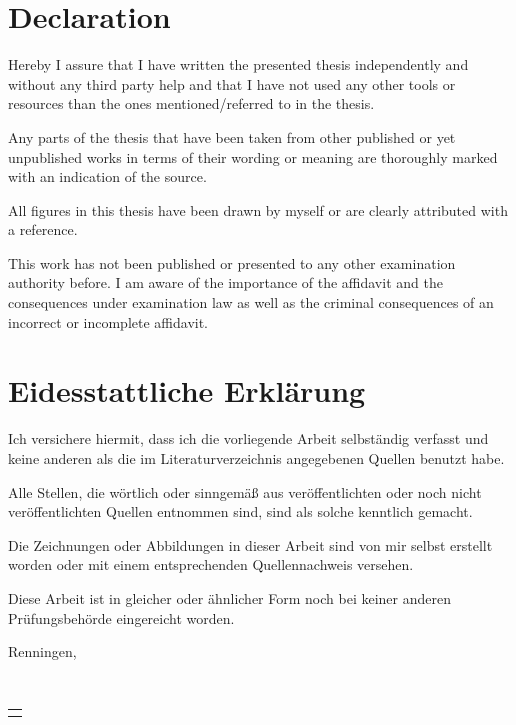 
\ifdefined\ThesisLanguageIsEnglish
	\chapter*{Declaration}
		\thispagestyle{empty}
		Hereby I assure that I have written the presented thesis independently and without any third party help and that I have not used any other tools or resources than the ones mentioned/referred to in the thesis.
	\medskip

	\noindent
		Any parts of the thesis that have been taken from other published or yet unpublished works in terms of their wording or meaning are thoroughly marked with an indication of the source. 
	\medskip

	\noindent
		All figures in this thesis have been drawn by myself or are clearly attributed with a reference. 
	\medskip

	\noindent
		This work has not been published or presented to any other examination authority before.
		I am aware of the importance of the affidavit and the consequences under examination
		law as well as the criminal consequences of an incorrect or incomplete affidavit.
	\medskip


\else
	\chapter*{Eidesstattliche Erklärung}
		\thispagestyle{empty}
			Ich versichere hiermit, dass ich die vorliegende Arbeit selbständig verfasst und keine anderen als die im Literaturverzeichnis angegebenen Quellen benutzt habe.
		\medskip

		\noindent
			Alle Stellen, die wörtlich oder sinngemäß aus veröffentlichten oder noch nicht veröffentlichten Quellen entnommen sind, sind als solche kenntlich gemacht.
		\medskip

		\noindent
			Die Zeichnungen oder Abbildungen in dieser Arbeit sind von mir selbst erstellt worden oder mit einem entsprechenden Quellennachweis versehen.
		\medskip

		\noindent
			Diese Arbeit ist in gleicher oder ähnlicher Form noch bei keiner anderen Prüfungsbehörde eingereicht worden. 
		\bigskip
\fi

Renningen, \ThesisDeliveryDate

\smallskip

\hfill {} \\ 
\vspace*{-1.7cm}
\begin{flushright}
	\begin{tabular}{m{5cm}}
		\\ \hline
		\centering \textbf{\myName}\\
	\end{tabular}
\end{flushright}


